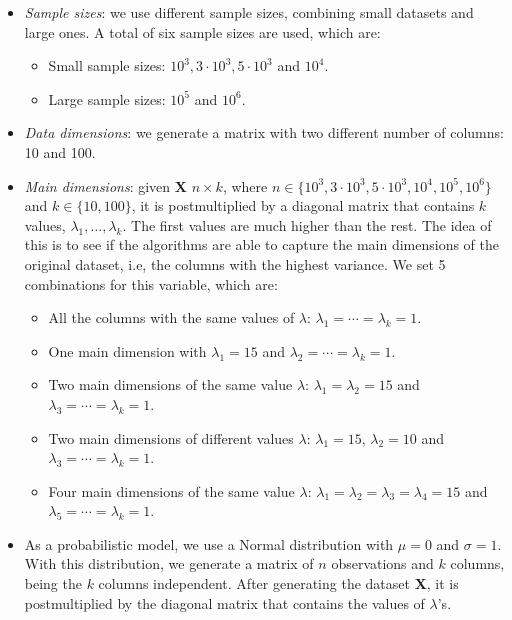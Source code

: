 \documentclass[11pt]{report}
\begin{document}
\begin{itemize}
\item \textit{Sample sizes}: we use different sample sizes, combining small
datasets and large ones. A total of six sample sizes are used, which are:

\begin{itemize}
\item Small sample sizes: $10^3, 3\cdot 10^3, 5\cdot 10^3$ and $10^4$.

\item Large sample sizes: $10^5$ and $10^6$.
\end{itemize}



\item \textit{Data dimensions}: we generate a matrix with two different number 
of columns: 10 and 100.

\item \textit{Main dimensions}: given \textbf{X} $n \times k$,
where $n \in \{10^3, 3\cdot 10^3, 5\cdot10^3, 10^4, 10^5, 10^6 \}$ and 
$k \in \{10, 100\}$, it is postmultiplied by a diagonal matrix that contains 
$k$ values,  $\lambda_1, \dots, \lambda_k$. The first values are much 
higher than the rest. The idea of this is to see if the algorithms are able 
to capture the main dimensions of the original dataset, i.e, the columns 
with the highest variance. We set 5 combinations for this variable, which are:

\begin{itemize}
\item All the columns with the same values of $\lambda$: 
$\lambda_1 = \cdots = \lambda_k = 1$.

\item One main dimension with $\lambda_1 = 15$ and 
$\lambda_2 = \cdots = \lambda_k = 1$.

\item  Two main dimensions of the same value $\lambda$: 
$\lambda_1  = \lambda_2 = 15$ and $\lambda_3 = \cdots = \lambda_k = 1$.

\item  Two main dimensions of different values $\lambda$: 
$\lambda_1  = 15$, $\lambda_2 =10$ and $\lambda_3 = \cdots = \lambda_k = 1$.

\item  Four main dimensions of the same value $\lambda$: 
$\lambda_1  = \lambda_2 = \lambda_3 = \lambda_4 = 15$ and $\lambda_5 = \cdots = \lambda_k = 1$.


\end{itemize}

\item As a probabilistic model, we use a Normal distribution with $\mu = 0$ and 
$\sigma = 1$. With this distribution, we generate a matrix of $n$ observations
and $k$ columns, being the $k$ columns independent. After generating the 
dataset \textbf{X}, it is postmultiplied by the diagonal matrix that contains
the values of $\lambda$'s.


\end{itemize}
\end{document}
